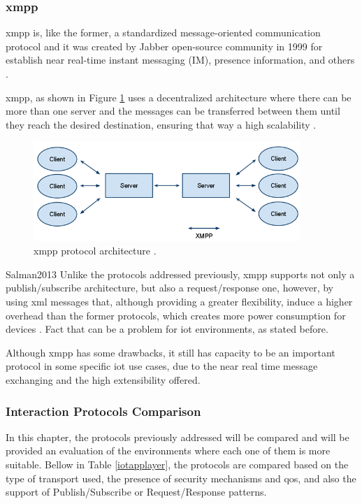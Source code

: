 \subsubsection{\acf{xmpp}}

\acf{xmpp} is, like the former, a standardized message-oriented communication protocol and it was created by Jabber open-source community in 1999 for establish near real-time instant messaging (IM), presence information, and others \cite{Badugu}.

\ac{xmpp}, as shown in Figure \ref{fig:xmpp} uses a decentralized architecture where there can be more than one server and the messages can be transferred between them until they reach the desired destination, ensuring that way a high scalability \cite{Al-fuqaha2015}.

\begin{figure}[H]
	\centering
	\includegraphics[width=0.9\textwidth]{figures/xmpp.png}
	\caption{\ac{xmpp} protocol architecture \cite{Adafruit}.}
	\label{fig:xmpp}
\end{figure}

Salman2013
Unlike the protocols addressed previously, \ac{xmpp} supports not only a publish/subscribe architecture, but also a request/response one, however, by using \ac{xml} messages that, although providing a greater flexibility, induce a higher overhead than the former protocols, which creates more power consumption for devices \cite{Salman2013}. Fact that can be a problem for \ac{iot} environments, as stated before.

Although \ac{xmpp} has some drawbacks, it still has capacity to be an important protocol in some specific \ac{iot} use cases, due to the near real time message exchanging and the high extensibility offered.

\subsubsection{Interaction Protocols Comparison}

In this chapter, the protocols previously addressed will be compared and will be provided an evaluation of the environments where each one of them is more suitable. Bellow in Table \ref{iotapplayer}, the protocols are compared based on the type of transport used, the presence of security mechanisms and \ac{qos}, and also the support of Publish/Subscribe or Request/Response patterns.

